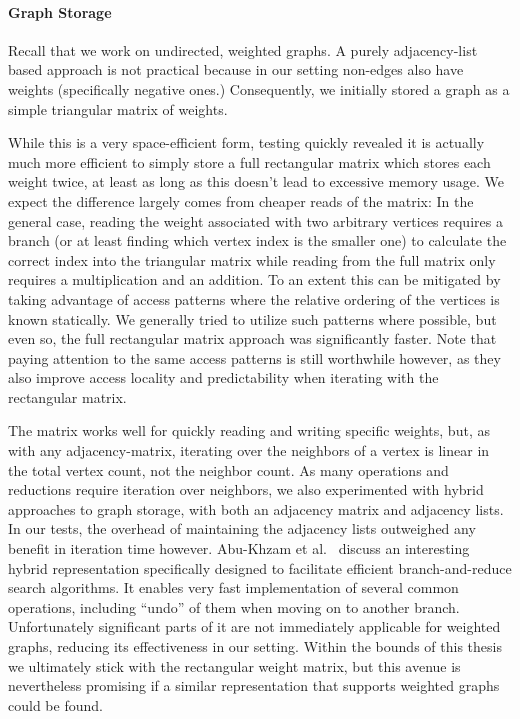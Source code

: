 \documentclass[12pt,oneside,english,parskip=full,headings=small]{scrbook}
\theoremstyle{definition}
\begin{document}
\paragraph{Graph Storage} Recall that we work on undirected, weighted graphs. A purely
adjacency-list based approach is not practical because in our setting non-edges also have weights
(specifically negative ones.) Consequently, we initially stored a graph as a simple triangular
matrix of weights.

While this is a very space-efficient form, testing quickly revealed it is actually much more
efficient to simply store a full rectangular matrix which stores each weight twice, at least as long
as this doesn't lead to excessive memory usage. We expect the difference largely comes from cheaper
reads of the matrix: In the general case, reading the weight associated with two arbitrary vertices
requires a branch (or at least finding which vertex index is the smaller one) to calculate the
correct index into the triangular matrix while reading from the full matrix only requires a
multiplication and an addition. To an extent this can be mitigated by taking advantage of access
patterns where the relative ordering of the vertices is known statically. We generally tried to
utilize such patterns where possible, but even so, the full rectangular matrix approach was
significantly faster. Note that paying attention to the same access patterns is still worthwhile
however, as they also improve access locality and predictability when iterating with the rectangular
matrix.

The matrix works well for quickly reading and writing specific weights, but, as with any
adjacency-matrix, iterating over the neighbors of a vertex is linear in the total vertex count, not
the neighbor count. As many operations and reductions require iteration over neighbors, we also
experimented with hybrid approaches to graph storage, with both an adjacency matrix and adjacency
lists. In our tests, the overhead of maintaining the adjacency lists outweighed any benefit in
iteration time however. Abu-Khzam et al.~\cite{AbuKhzam} discuss an interesting hybrid
representation specifically designed to facilitate efficient branch-and-reduce search algorithms. It
enables very fast implementation of several common operations, including ``undo'' of them when
moving on to another branch. Unfortunately significant parts of it are not immediately applicable
for weighted graphs, reducing its effectiveness in our setting. Within the bounds of this thesis we
ultimately stick with the rectangular weight matrix, but this avenue is nevertheless promising if a
similar representation that supports weighted graphs could be found.
\end{document}
